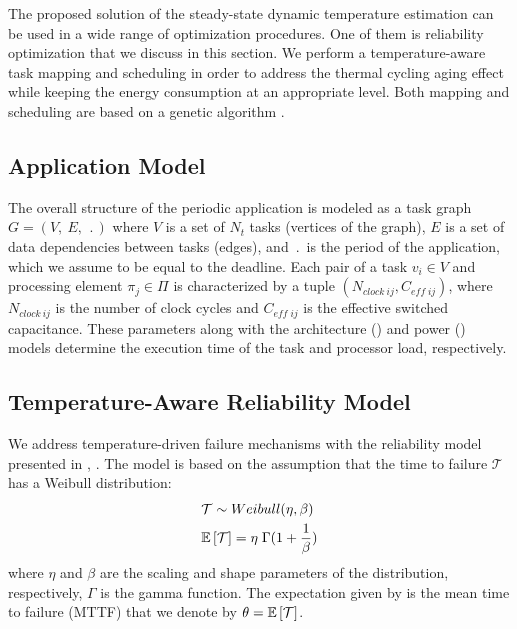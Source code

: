 The proposed solution of the steady-state dynamic temperature estimation can be used in a wide range of optimization procedures. One of them is reliability optimization that we discuss in this section. We perform a temperature-aware task mapping and scheduling in order to address the thermal cycling aging effect while keeping the energy consumption at an appropriate level. Both mapping and scheduling are based on a genetic algorithm \cite{schmitz2004}.

\subsection{Application Model} \label{sec:application-model}
The overall structure of the periodic application is modeled as a task graph $G = (V, \: E, \: \period)$ where $V$ is a set of $N_t$ tasks (vertices of the graph), $E$ is a set of data dependencies between tasks (edges), and $\period$ is the period of the application, which we assume to be equal to the deadline. Each pair of a task $v_i \in V$ and processing element $\pi_j \in \Pi$ is characterized by a tuple $(N_{clock \: ij}, C_{eff \; ij})$, where $N_{clock \: ij}$ is the number of clock cycles and $C_{eff \; ij}$ is the effective switched capacitance. These parameters along with the architecture () and power () models determine the execution time of the task and processor load, respectively.

\subsection{Temperature-Aware Reliability Model} \label{sec:reliability-model}
We address temperature-driven failure mechanisms with the reliability model presented in \cite{huang2009}, \cite{xiang2010}. The model is based on the assumption that the time to failure $\mathcal{T}$ has a Weibull distribution:
\begin{align}
  & \mathcal{T} \sim Weibull(\eta, \beta) \nonumber \\
  & \mathbb{E}\left[ \mathcal{T} \right] = \eta \; \Gamma(1 + \frac{1}{\beta}) \label{eq:general-mttf}
\end{align}
where $\eta$ and $\beta$ are the scaling and shape parameters of the distribution, respectively, $\Gamma$ is the gamma function. The expectation given by  is the mean time to failure (MTTF) that we denote by $\theta = \mathbb{E}\left[ \mathcal{T} \right]$.

